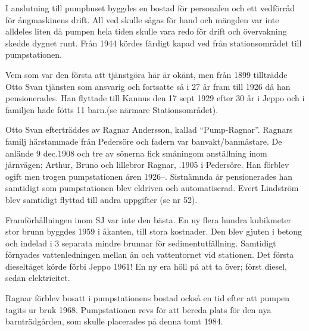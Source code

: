 
I anslutning till pumphuset byggdes en bostad för personalen och ett vedförråd för ångmaskinens drift. All ved skulle sågas för hand och mängden var inte alldeles liten då pumpen hela tiden skulle vara redo för drift och övervakning skedde dygnet runt. Från 1944 kördes färdigt kapad ved från stationsområdet till pumpstationen.

Vem som var den första att tjänstgöra här är okänt, men från 1899 tillträdde Otto Svan tjänsten som ansvarig och fortsatte så i 27 år fram till 1926 då han pensionerades. Han flyttade till Kannus den 17 sept 1929 efter 30 år i Jeppo och i familjen hade fötts 11 barn.(se närmare Stationsområdet).


Otto Svan efterträddes av Ragnar Andersson, kallad ``Pump-Ragnar''. Ragnars familj härstammade från Pedersöre och fadern var banvakt/banmästare. De anlände 9 dec.1908 och tre av sönerna fick småningom anställning inom järnvägen; Arthur, Bruno och lillebror Ragnar, .1905 i Pedersöre. Han förblev ogift men trogen pumpstationen åren 1926--. Sistnämnda år pensionerades han samtidigt som pumpstationen blev eldriven och automatiserad. Evert Lindström blev samtidigt flyttad till andra uppgifter (se nr 52).

Framförhållningen inom SJ var inte den bästa. En ny flera hundra kubikmeter stor brunn byggdes 1959 i åkanten, till stora kostnader. Den blev gjuten i betong och indelad i 3 separata mindre brunnar för sedimentutfällning. Samtidigt förnyades vattenledningen mellan ån och vattentornet vid stationen. Det första dieseltåget körde förbi Jeppo 1961! En ny era höll på att ta över; först diesel, sedan elektricitet.

Ragnar förblev bosatt i  pumpstationens bostad också en tid efter att pumpen tagits ur bruk 1968. Pumpstationen revs för att bereda plats för den nya barnträdgården, som skulle placerades på denna tomt 1984.






